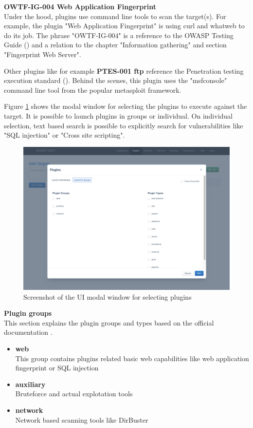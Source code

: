 \textbf{OWTF-IG-004 Web Application Fingerprint}\\

Under the hood, plugins use command line tools to scan the target(s). For example, the plugin "Web Application Fingerprint" is using curl and whatweb to do its job. The phrase "OWTF-IG-004" is a reference to the OWASP Testing Guide (\cite{Guide.11.06.2021}) and a relation to the chapter "Information gathering" and section "Fingerprint Web Server".

Other plugins like for example \textbf{PTES-001 ftp} reference the Penetration testing execution standard (\cite{PTES.11.06.2021}). Behind the scenes, this plugin uses the "msfconsole" command line tool from the popular metasploit framework.

Figure \ref{fig:ui2} shows the modal window for selecting the plugins to execute against the target. It is possible to launch plugins in groups or individual. On individual selection, text based search is possible to explicitly search for vulnerabilities like "SQL injection" or "Cross site scripting".

\begin{figure}[H]
	\centering
	\includegraphics[width=12cm,keepaspectratio=true]{pictures/ui2.png}
	\caption{
		Screenshot of the UI modal window for selecting plugins
	}
	\label{fig:ui2}
\end{figure}

\textbf{Plugin groups}\\

This section explains the plugin groups and types based on the official documentation \cite{OWTFDocs.11.06.2021}.

\begin{itemize}
	\item \textbf{web}\\
	This group contains plugins related basic web capabilities like web application fingerprint or SQL injection
	\item \textbf{auxiliary}\\
	Bruteforce and actual explotation tools
	\item \textbf{network}\\
	Network based scanning tools like DirBuster
\end{itemize}

